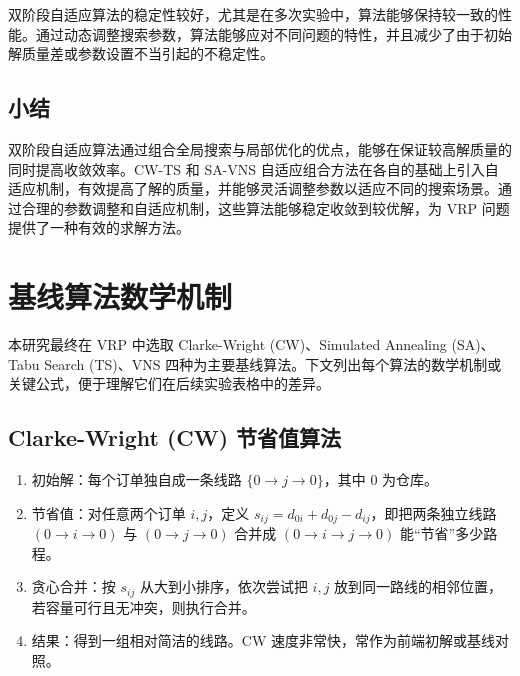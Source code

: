 \documentclass[12pt,a4paper,twoside]{ctexbook}
\begin{document}
双阶段自适应算法的稳定性较好，尤其是在多次实验中，算法能够保持较一致的性能。通过动态调整搜索参数，算法能够应对不同问题的特性，并且减少了由于初始解质量差或参数设置不当引起的不稳定性。

\subsection{小结}
双阶段自适应算法通过组合全局搜索与局部优化的优点，能够在保证较高解质量的同时提高收敛效率。CW-TS 和 SA-VNS 自适应组合方法在各自的基础上引入自适应机制，有效提高了解的质量，并能够灵活调整参数以适应不同的搜索场景。通过合理的参数调整和自适应机制，这些算法能够稳定收敛到较优解，为 VRP 问题提供了一种有效的求解方法。

\section{基线算法数学机制}
本研究最终在 VRP 中选取 Clarke-Wright (CW)、Simulated Annealing (SA)、Tabu Search (TS)、VNS 四种为主要基线算法。下文列出每个算法的数学机制或关键公式，便于理解它们在后续实验表格中的差异。

\subsection{Clarke-Wright (CW) 节省值算法}
\begin{enumerate}
    \item 初始解：每个订单独自成一条线路 $\{0\rightarrow j\rightarrow 0\}$，其中 0 为仓库。
    \item 节省值：对任意两个订单 $i,j$，定义 $s_{ij} = d_{0i} + d_{0j} - d_{ij}$，即把两条独立线路 $(0\rightarrow i\rightarrow 0)$ 与 $(0\rightarrow j\rightarrow 0)$ 合并成 $(0\rightarrow i\rightarrow j\rightarrow 0)$ 能“节省”多少路程。
    \item 贪心合并：按 $s_{ij}$ 从大到小排序，依次尝试把 $i,j$ 放到同一路线的相邻位置，若容量可行且无冲突，则执行合并。
    \item 结果：得到一组相对简洁的线路。CW 速度非常快，常作为前端初解或基线对照。
\end{enumerate}
\end{document}
